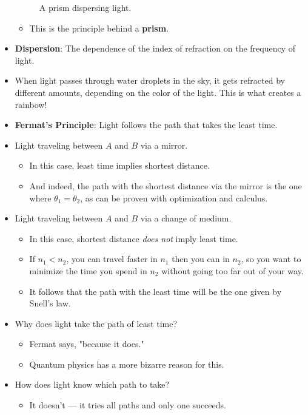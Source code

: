\documentclass[../notes.tex]{subfiles}
\begin{document}
\begin{itemize}
\begin{figure}[h!]
        \caption{A prism dispersing light.}
        \label{fig:prism}
    \end{figure}
    \begin{itemize}
        \item This is the principle behind a \textbf{prism}.
    \end{itemize}
    \item \textbf{Dispersion}: The dependence of the index of refraction on the frequency of light.
    \item When light passes through water droplets in the sky, it gets refracted by different amounts, depending on the color of the light. This is what creates a rainbow!
    \item \textbf{Fermat's Principle}: Light follows the path that takes the least time.
    \item Light traveling between $A$ and $B$ via a mirror.
    \begin{itemize}
        \item In this case, least time implies shortest distance.
        \item And indeed, the path with the shortest distance via the mirror is the one where $\theta_1=\theta_2$, as can be proven with optimization and calculus.
    \end{itemize}
    \item Light traveling between $A$ and $B$ via a change of medium.
    \begin{itemize}
        \item In this case, shortest distance \emph{does not} imply least time.
        \item If $n_1<n_2$, you can travel faster in $n_1$ then you can in $n_2$, so you want to minimize the time you spend in $n_2$ without going too far out of your way.
        \item It follows that the path with the least time will be the one given by Snell's law.
    \end{itemize}
    \item Why does light take the path of least time?
    \begin{itemize}
        \item Fermat says, "because it does."
        \item Quantum physics has a more bizarre reason for this.
    \end{itemize}
    \item How does light know which path to take?
    \begin{itemize}
        \item It doesn't --- it tries all paths and only one succeeds.
    \end{itemize}
\end{itemize}
\end{document}
